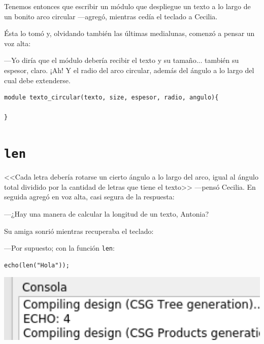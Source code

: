 \guillemotright Tenemos entonces que escribir un módulo que despliegue
un texto a lo largo de un bonito arco circular ---agregó, mientras
cedía el teclado a Cecilia.

Ésta lo tomó y, olvidando también las últimas medialunas, comenzó a
pensar un voz alta:

---Yo diría que el módulo debería recibir el texto y su
tamaño... también su espesor, claro. ¡Ah! Y el radio del arco
circular, además del ángulo a lo largo del cual debe extenderse.

\begin{lstlisting}
module texto_circular(texto, size, espesor, radio, angulo){

}
\end{lstlisting}

\section{\texttt{len}}


<<Cada letra debería rotarse un cierto ángulo a lo largo del arco,
igual al ángulo total dividido por la cantidad de letras que tiene el
texto>> ---pensó Cecilia. En seguida agregó en voz alta, casi segura
de la respuesta:

---¿Hay una manera de calcular la longitud de un texto, Antonia?

Su amiga sonrió mientras recuperaba el teclado:

---Por supuesto; con la función \lstinline!len!:

\begin{center}
\begin{minipage}[]{.44\textwidth}%
 \begin{lstlisting}[numbers=none]
echo(len("Hola"));
\end{lstlisting}%
\end{minipage}\hfill
\begin{minipage}[]{.55\textwidth}%
  \centering
  \includegraphics[width=1\textwidth]{imagenes/echo-len}
\end{minipage}
\end{center}

